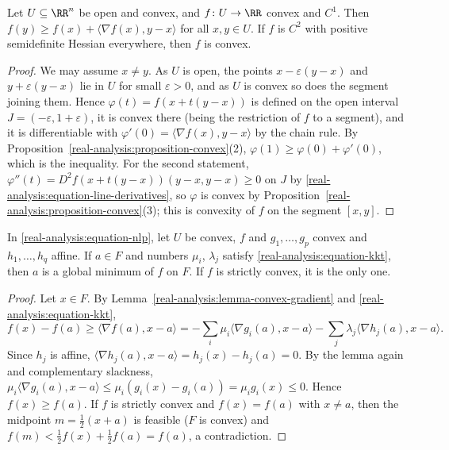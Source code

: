 \begin{lemma}\label{real-analysis:lemma-convex-gradient}
Let $U \subseteq \RR^n$ be open and convex, and $f \colon U \to \RR$ convex and $C^1$. Then $f(y) \geq f(x) + \langle\nabla f(x), y - x\rangle$ for all $x, y \in U$. If $f$ is $C^2$ with positive
semidefinite Hessian everywhere, then $f$ is convex.
\end{lemma}

\begin{proof}
We may assume $x \neq y$. As $U$ is open, the points $x - \varepsilon(y - x)$ and $y + \varepsilon(y - x)$ lie in $U$ for small $\varepsilon > 0$, and as $U$ is convex so does the segment joining them.
Hence $\varphi(t) = f(x + t(y - x))$ is defined on the open interval $J = (-\varepsilon, 1 + \varepsilon)$, it is convex there (being the restriction of $f$ to a segment), and it is differentiable with
$\varphi'(0) = \langle\nabla f(x), y - x\rangle$ by the chain rule. By Proposition~\ref{real-analysis:proposition-convex}(2), $\varphi(1) \geq \varphi(0) + \varphi'(0)$, which is the inequality. For the
second statement, $\varphi''(t) = D^2f(x + t(y - x))(y - x, y - x) \geq 0$ on $J$ by \eqref{real-analysis:equation-line-derivatives}, so $\varphi$ is convex by
Proposition~\ref{real-analysis:proposition-convex}(3); this is convexity of $f$ on the segment $[x, y]$.
\end{proof}

\begin{theorem}\label{real-analysis:theorem-kkt-convex}
In \eqref{real-analysis:equation-nlp}, let $U$ be convex, $f$ and $g_1, \ldots, g_p$ convex and $h_1, \ldots, h_q$ affine. If $a \in F$ and numbers $\mu_i$, $\lambda_j$ satisfy
\eqref{real-analysis:equation-kkt}, then $a$ is a global minimum of $f$ on $F$. If $f$ is strictly convex, it is the only one.
\end{theorem}

\begin{proof}
Let $x \in F$. By Lemma~\ref{real-analysis:lemma-convex-gradient} and \eqref{real-analysis:equation-kkt},
\[
f(x) - f(a) \geq \langle\nabla f(a), x - a\rangle = -\sum_i\mu_i\langle\nabla g_i(a), x - a\rangle - \sum_j\lambda_j\langle\nabla h_j(a), x - a\rangle.
\]
Since $h_j$ is affine, $\langle\nabla h_j(a), x - a\rangle = h_j(x) - h_j(a) = 0$. By the lemma again and complementary slackness,
$\mu_i\langle\nabla g_i(a), x - a\rangle \leq \mu_i(g_i(x) - g_i(a)) = \mu_ig_i(x) \leq 0$. Hence $f(x) \geq f(a)$. If $f$ is strictly convex and $f(x) = f(a)$ with $x \neq a$, then the midpoint
$m = \frac12(x + a)$ is feasible ($F$ is convex) and $f(m) < \frac12f(x) + \frac12f(a) = f(a)$, a contradiction.
\end{proof}

